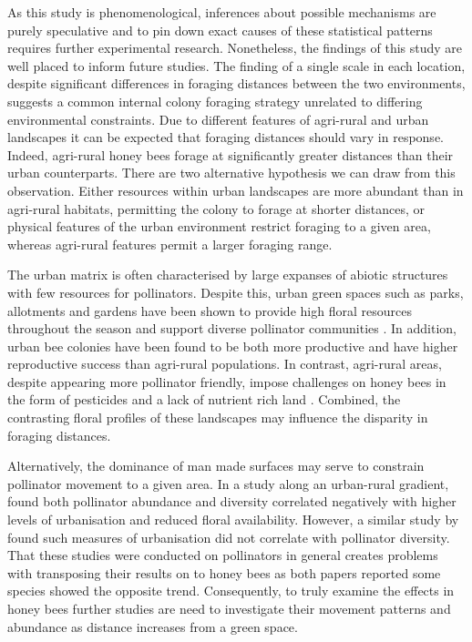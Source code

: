 \documentclass[11pt,usenames,dvipsnames,a4paper]{article}
\begin{document}
\begin{linenumbers}
As this study is phenomenological, inferences about possible mechanisms are purely speculative and to pin down exact causes of these statistical patterns requires further experimental research. Nonetheless, the findings of this study are well placed to inform future studies. The finding of a single scale in each location, despite significant differences in foraging distances between the two environments, suggests a common internal colony foraging strategy unrelated to differing environmental constraints. Due to different features of agri-rural and urban landscapes it can be expected that foraging distances should vary in response. Indeed, agri-rural honey bees forage at significantly greater distances than their urban counterparts. There are two alternative hypothesis we can draw from this observation. Either resources within urban landscapes are more abundant than in agri-rural habitats, permitting the colony to forage at shorter distances, or physical features of the urban environment restrict foraging to a given area, whereas agri-rural features permit a larger foraging range.

The urban matrix is often characterised by large expanses of abiotic structures with few resources for pollinators. Despite this, urban green spaces such as parks, allotments and gardens have been shown to provide high floral resources throughout the season \citep{Baldock2015, Baldock2019, Plascencia2017} and support diverse pollinator communities \citep{Hall2017}. In addition, urban bee colonies have been found to be both more productive \citep{Lecocq2015} and have higher reproductive success \cite{Samuelson2018} than agri-rural populations. In contrast, agri-rural areas, despite appearing more pollinator friendly, impose challenges on honey bees in the form of pesticides \citep{Wood2017} and a lack of nutrient rich land \citep{Carvell2006}. Combined, the contrasting floral profiles of these landscapes may influence the disparity in foraging distances.

Alternatively, the dominance of man made surfaces may serve to constrain pollinator movement to a given area. In a study along an urban-rural gradient, \cite{Bates2011} found both pollinator abundance and diversity correlated negatively with higher levels of urbanisation and reduced floral availability. However, a similar study by \cite{Kearns2009} found such measures of urbanisation did not correlate with pollinator diversity. That these studies were conducted on pollinators in general creates problems with transposing their results on to honey bees as both papers reported some species showed the opposite trend. Consequently, to truly examine the effects in honey bees further studies are need to investigate their movement patterns and abundance as distance increases from a green space. 


\end{linenumbers}
\end{document}
